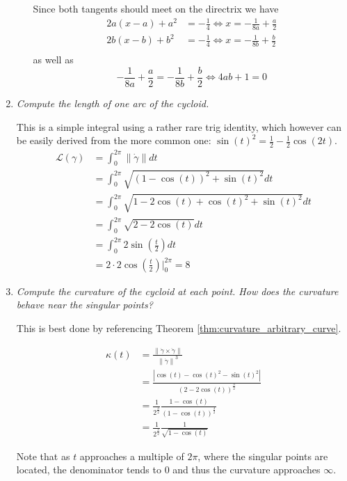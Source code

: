 \documentclass[a4paper,11pt,notitlepage,fullpage]{paper}
\newcommand{\dy}{\dot\gamma}
\newcommand{\ddy}{\ddot\gamma}
\theoremstyle{plain}
\theoremstyle{definition}
\begin{document}
\begin{enumerate}
\begin{enumerate}
Since both tangents should meet on the directrix we have
\begin{align*}
	2a(x-a)+a^2&=-\frac{1}{4} \Leftrightarrow x=-\frac{1}{8a}+\frac{a}{2} \\
	2b(x-b)+b^2&=-\frac{1}{4} \Leftrightarrow x=-\frac{1}{8b}+\frac{b}{2}\\
\end{align*}
as well as
\begin{equation*}
	-\frac{1}{8a}+\frac{a}{2} = -\frac{1}{8b}+\frac{b}{2} \Leftrightarrow 4ab+1=0
\end{equation*}
\end{enumerate}

\item \emph{Compute the length of one arc of the cycloid.}

This is a simple integral using a rather rare trig identity, which however can be easily derived from the more common one: $\sin(t)^2 = \frac{1}{2} - \frac{1}{2}\cos(2t)$.
\begin{align*}
\mathcal L(\gamma) &= \int_0^{2\pi} \left\| \dot\gamma \right\| dt \\
&= \int_0^{2\pi} \sqrt{(1-\cos(t))^2 + \sin(t)^2} dt \\
&= \int_0^{2\pi} \sqrt{1 - 2\cos(t) + \cos(t)^2 + \sin(t)^2} dt \\
&= \int_0^{2\pi} \sqrt{2 - 2\cos(t)} dt \\
&= \int_0^{2\pi} 2 \sin\left(\frac{t}{2}\right) dt \\
&= 2 \cdot 2 \cos\left(\frac{t}{2}\right)\Bigg|_0^{2\pi} = 8
\end{align*}


\item \emph{Compute the curvature of the cycloid at each point. How does the curvature behave near the singular points?}

This is best done by referencing Theorem \ref{thm:curvature_arbitrary_curve}.

\begin{align*}
\kappa(t) &= \frac{\left\|\dy \times \ddy\right\|}{\left\|\dy\right\|^3} \\
&= \frac{|\cos(t) - \cos(t)^2 - \sin(t)^2|}{(2 - 2\cos(t))^{\frac{3}{2}}} \\
&= \frac{1}{2^{\frac{3}{2}}} \frac{1 - \cos(t)}{(1 - \cos(t))^{\frac{3}{2}}} \\
&= \frac{1}{2^{\frac{3}{2}}} \frac{1}{\sqrt{1 - \cos(t)}}
\end{align*}

Note that as $t$ approaches a multiple of $2\pi$, where the singular points are located, the denominator tends to $0$ and thus the curvature approaches $\infty$.




\end{enumerate}
\end{document}
